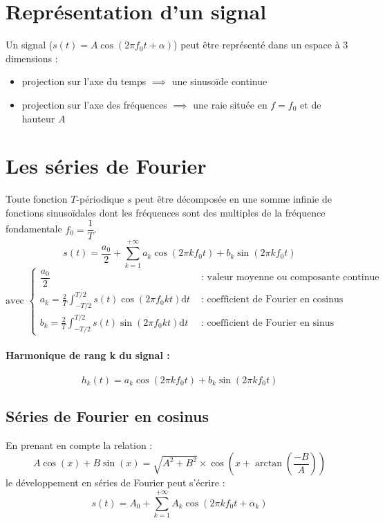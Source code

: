 \documentclass[a4paper,12pt]{report}
\begin{document}
\section{Représentation d'un signal}

Un signal ($s(t) = A \cos(2\pi f_{0}t + \alpha)$) peut être représenté dans un espace à 3 dimensions :
\begin{itemize}
    \item projection sur l'axe du temps $\implies$ une sinusoïde continue
    \item projection sur l'axe des fréquences $\implies$ une raie située en $f = f_{0}$ et de hauteur $A$
\end{itemize}

\section{Les séries de Fourier}

\begin{defi}
    Toute fonction $T$-périodique $s$ peut être décomposée en une somme infinie de fonctions sinusoïdales dont les fréquences sont des multiples de la fréquence fondamentale $f_{0} = \dfrac{1}{T}$.
    \[ s(t) = \dfrac{a_{0}}{2} + \sum_{k=1}^{+\infty} a_{k} \cos(2\pi k f_{0} t) + b_{k} \sin(2\pi k f_{0} t) \]
    \[ \text{avec } \begin{cases}
        \dfrac{a_{0}}{2} & \text{ : valeur moyenne ou composante continue} \\
        a_{k} = \frac{2}{T} \int_ {-T/2}^{T/2} s(t) \cos(2\pi f_{0} kt) \mathrm{d}t & \text{ : coefficient de Fourier en cosinus} \\
        b_{k} = \frac{2}{T} \int_ {-T/2}^{T/2} s(t) \sin(2\pi f_{0} kt) \mathrm{d}t & \text{ : coefficient de Fourier en sinus}
    \end{cases} \]
\end{defi}

\paragraph{Harmonique de rang k du signal :}
\[ h_{k}(t) = a_{k} \cos(2\pi kf_{0}t) + b_{k} \sin(2\pi kf_{0}t) \]

\subsection{Séries de Fourier en cosinus}

En prenant en compte la relation :
\[ A \cos(x) + B \sin(x) = \sqrt{A^2 + B^2} \times \cos(x + \arctan(\dfrac{-B}{A})) \]
le développement en séries de Fourier peut s'écrire :
\[ s(t) = A_0 + \sum_{k=1}^{+\infty} A_k \cos(2\pi kf_0 t + \alpha_k) \]
\end{document}
